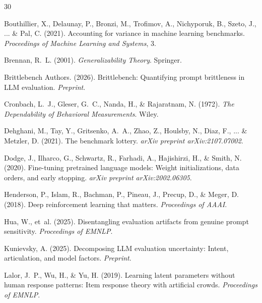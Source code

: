 \documentclass[letterpaper]{article}
\begin{document}
\begin{thebibliography}{30}

Bouthillier, X., Delaunay, P., Bronzi, M., Trofimov, A., Nichyporuk, B., Szeto, J., ... \& Pal, C. (2021).
\newblock Accounting for variance in machine learning benchmarks.
\newblock \textit{Proceedings of Machine Learning and Systems}, 3.

Brennan, R.~L. (2001).
\newblock \textit{Generalizability Theory}.
\newblock Springer.

Brittlebench Authors. (2026).
\newblock Brittlebench: Quantifying prompt brittleness in LLM evaluation.
\newblock \textit{Preprint}.

Cronbach, L.~J., Gleser, G.~C., Nanda, H., \& Rajaratnam, N. (1972).
\newblock \textit{The Dependability of Behavioral Measurements}.
\newblock Wiley.

Dehghani, M., Tay, Y., Gritsenko, A.~A., Zhao, Z., Houlsby, N., Diaz, F., ... \& Metzler, D. (2021).
\newblock The benchmark lottery.
\newblock \textit{arXiv preprint arXiv:2107.07002}.

Dodge, J., Ilharco, G., Schwartz, R., Farhadi, A., Hajishirzi, H., \& Smith, N. (2020).
\newblock Fine-tuning pretrained language models: Weight initializations, data orders, and early stopping.
\newblock \textit{arXiv preprint arXiv:2002.06305}.

Henderson, P., Islam, R., Bachman, P., Pineau, J., Precup, D., \& Meger, D. (2018).
\newblock Deep reinforcement learning that matters.
\newblock \textit{Proceedings of AAAI}.

Hua, W., et~al. (2025).
\newblock Disentangling evaluation artifacts from genuine prompt sensitivity.
\newblock \textit{Proceedings of EMNLP}.

Kunievsky, A. (2025).
\newblock Decomposing LLM evaluation uncertainty: Intent, articulation, and model factors.
\newblock \textit{Preprint}.

Lalor, J.~P., Wu, H., \& Yu, H. (2019).
\newblock Learning latent parameters without human response patterns: Item response theory with artificial crowds.
\newblock \textit{Proceedings of EMNLP}.


\end{thebibliography}
\end{document}
